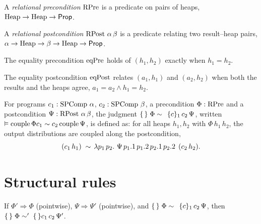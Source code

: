 \begin{definition}
  \label{def:rpre}
  \leanok
  A \emph{relational precondition} $\operatorname{RPre}$ is a predicate on pairs of heaps,
  $\operatorname{Heap} \to \operatorname{Heap} \to \mathsf{Prop}$.
\end{definition}

\begin{definition}
  \label{def:rpost}
  \leanok
  A \emph{relational postcondition} $\operatorname{RPost}\,\alpha\,\beta$ is a predicate
  relating two result--heap pairs,
  $\alpha \to \operatorname{Heap} \to \beta \to \operatorname{Heap} \to \mathsf{Prop}$.
\end{definition}

\begin{definition}
  \label{def:eqpre}
  \leanok
  The equality precondition $\operatorname{eqPre}$ holds of $(h_1,h_2)$ exactly when
  $h_1 = h_2$.
\end{definition}

\begin{definition}
  \label{def:eqpost}
  \leanok
  The equality postcondition $\operatorname{eqPost}$ relates $(a_1,h_1)$ and $(a_2,h_2)$ when
  both the results and the heaps agree, $a_1 = a_2 \wedge h_1 = h_2$.
\end{definition}

\begin{definition}
  \label{def:rhoare}
  \leanok
  For programs $c_1 : \operatorname{SPComp}\,\alpha$, $c_2 : \operatorname{SPComp}\,\beta$, a precondition
  $\Phi : \operatorname{RPre}$ and a postcondition $\Psi : \operatorname{RPost}\,\alpha\,\beta$, the
  judgment $\{\,\}\;\Phi \sim \,\;\{c\}_1\,c_2\,\Psi$, written
  $\vDash \operatorname{couple}{\Phi} c_1 \sim c_2 \operatorname{couple}{\Psi}$, is defined as: for all heaps
  $h_1,h_2$ with $\Phi\,h_1\,h_2$, the output distributions are coupled along the
  postcondition,
  \[
    (c_1\,h_1) \;\liftrel{\,\lambda p_1\,p_2.\ \Psi\,p_1.1\,p_1.2\,p_2.1\,p_2.2\,}\; (c_2\,h_2).
  \]
\end{definition}

\section{Structural rules}

\begin{theorem}[Consequence]
  \label{thm:rhoare-conseq}
  \leanok
  If $\Phi' \Rightarrow \Phi$ (pointwise), $\Psi \Rightarrow \Psi'$ (pointwise),
  and $\{\,\}\;\Phi \sim \,\;\{c\}_1\,c_2\,\Psi$, then $\{\,\}\;\Phi \sim '\;\{\,\}c_1\,c_2\,\Psi'$.
\end{theorem}

